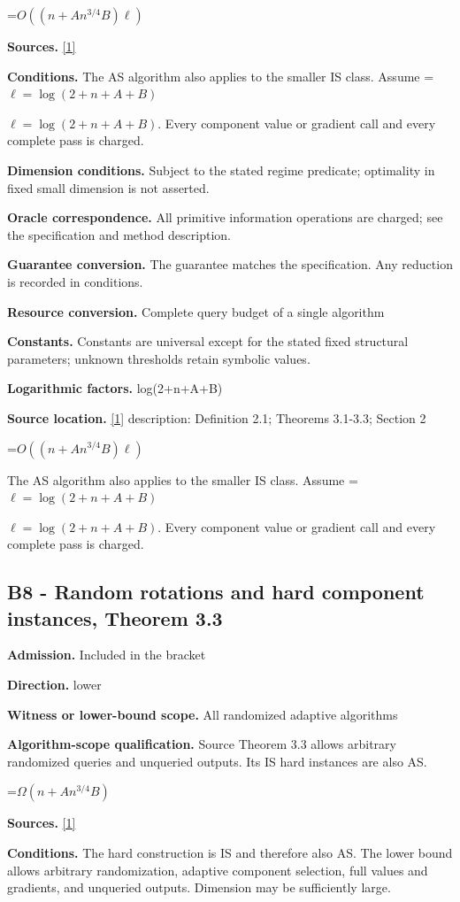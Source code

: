 \documentclass[10pt,a4paper]{article}
\newcommand{\AtlasMath}[1]{\par\begingroup\centering\setbox0=\hbox{$\displaystyle #1$}\ifdim\wd0>1.4\linewidth\typeout{ATLAS WIDE FORMULA: \the\wd0}\fi\ifdim\wd0>\linewidth\resizebox{\linewidth}{!}{\box0}\else\box0\fi\par\endgroup}
\newcommand{\AtlasInlineMath}[1]{\begingroup\setbox0=\hbox{$#1$}\ifdim\wd0>.4\linewidth\endgroup\AtlasMath{#1}\else\endgroup$#1$\fi}
\begin{document}
\AtlasMath{O\!\left((n+An^{3/4}B)\ell\right)}
\textbf{Sources.} \href{https://arxiv.org/pdf/2610.16991v2}{[1]}

\textbf{Conditions.} The AS algorithm also applies to the smaller IS class. Assume \AtlasInlineMath{\ell=\log(2+n+A+B)}. Every component value or gradient call and every complete pass is charged.

\textbf{Dimension conditions.} Subject to the stated regime predicate; optimality in fixed small dimension is not asserted.

\textbf{Oracle correspondence.} All primitive information operations are charged; see the specification and method description.

\textbf{Guarantee conversion.} The guarantee matches the specification. Any reduction is recorded in conditions.

\textbf{Resource conversion.} Complete query budget of a single algorithm

\textbf{Constants.} Constants are universal except for the stated fixed structural parameters; unknown thresholds retain symbolic values.

\textbf{Logarithmic factors.} log(2+n+A+B)

\textbf{Source location.} \href{https://arxiv.org/pdf/2610.16991v2}{[1]} description: Definition 2.1; Theorems 3.1-3.3; Section 2

\AtlasMath{O\!\left((n+An^{3/4}B)\ell\right)}
The AS algorithm also applies to the smaller IS class. Assume \AtlasInlineMath{\ell=\log(2+n+A+B)}. Every component value or gradient call and every complete pass is charged.

\subsection{B8 - Random rotations and hard component instances, Theorem 3.3}
\textbf{Admission.} Included in the bracket

\textbf{Direction.} lower

\textbf{Witness or lower-bound scope.} All randomized adaptive algorithms

\textbf{Algorithm-scope qualification.} Source Theorem 3.3 allows arbitrary randomized queries and unqueried outputs. Its IS hard instances are also AS.

\AtlasMath{\Omega(n+An^{3/4}B)}
\textbf{Sources.} \href{https://arxiv.org/pdf/2610.16991v2}{[1]}

\textbf{Conditions.} The hard construction is IS and therefore also AS. The lower bound allows arbitrary randomization, adaptive component selection, full values and gradients, and unqueried outputs. Dimension may be sufficiently large.
\end{document}
